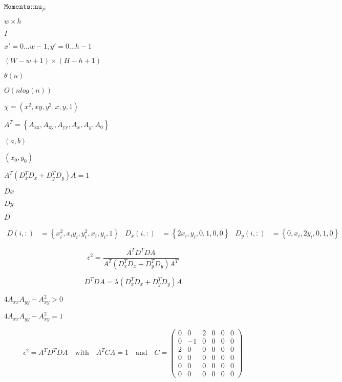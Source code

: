 \documentclass{article}
\begin{document}
$\texttt{Moments::nu}_{ji}$
\pagebreak

$w \times h$
\pagebreak

$I$
\pagebreak

$x' = 0...w-1, y' = 0...h-1$
\pagebreak

$(W-w+1) \times (H-h+1)$
\pagebreak

$\theta(n)$
\pagebreak

$O(n log(n))$
\pagebreak

$ \chi= \left(x^2, x y, y^2, x, y, 1\right) $
\pagebreak

$ A^T=\left\{A_{\text{xx}},A_{\text{xy}},A_{\text{yy}},A_x,A_y,A_0\right\} $
\pagebreak

$ (a,b) $
\pagebreak

$ (x_0,y_0) $
\pagebreak

$ A^T ( D_x^T D_x + D_y^T D_y) A = 1 $
\pagebreak

$ Dx $
\pagebreak

$ Dy $
\pagebreak

$ D $
\pagebreak

\begin{align*} D(i,:)&=\left\{x_i^2, x_i y_i, y_i^2, x_i, y_i, 1\right\} & D_x(i,:)&=\left\{2 x_i,y_i,0,1,0,0\right\} & D_y(i,:)&=\left\{0,x_i,2 y_i,0,1,0\right\} \end{align*}
\pagebreak

\begin{equation*} \epsilon ^2=\frac{ A^T D^T D A }{ A^T (D_x^T D_x + D_y^T D_y) A^T } \end{equation*}
\pagebreak

\begin{equation*} D^T D A = \lambda \left( D_x^T D_x + D_y^T D_y\right) A \end{equation*}
\pagebreak

$ 4 A_{xx} A_{yy}- A_{xy}^2 > 0 $
\pagebreak

$ 4 A_{xx} A_{yy}- A_{xy}^2=1 $
\pagebreak

\begin{equation*} \epsilon ^2= A^T D^T D A \quad \text{with} \quad A^T C A =1 \quad \text{and} \quad C=\left(\begin{matrix} 0 & 0 & 2 & 0 & 0 & 0 \\ 0 & -1 & 0 & 0 & 0 & 0 \\ 2 & 0 & 0 & 0 & 0 & 0 \\ 0 & 0 & 0 & 0 & 0 & 0 \\ 0 & 0 & 0 & 0 & 0 & 0 \\ 0 & 0 & 0 & 0 & 0 & 0 \end{matrix} \right) \end{equation*}
\pagebreak
\end{document}
